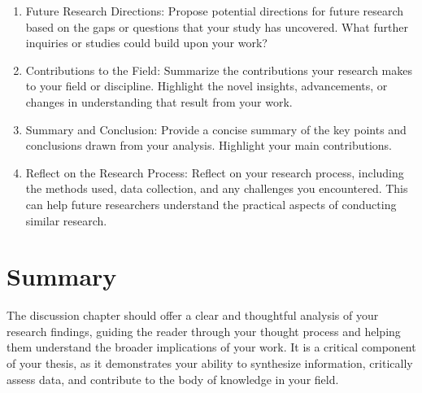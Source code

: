 \begin{enumerate}
\item Future Research Directions: Propose potential directions for future research based on the gaps or questions that your study has uncovered. What further inquiries or studies could build upon your work?

\item Contributions to the Field: Summarize the contributions your research makes to your field or discipline. Highlight the novel insights, advancements, or changes in understanding that result from your work.

\item Summary and Conclusion: Provide a concise summary of the key points and conclusions drawn from your analysis. Highlight your main contributions.

\item Reflect on the Research Process: Reflect on your research process, including the methods used, data collection, and any challenges you encountered. This can help future researchers understand the practical aspects of conducting similar research.

\end{enumerate}

\section{Summary}

The discussion chapter should offer a clear and thoughtful analysis of your research findings, guiding the reader through your thought process and helping them understand the broader implications of your work. It is a critical component of your thesis, as it demonstrates your ability to synthesize information, critically assess data, and contribute to the body of knowledge in your field.










